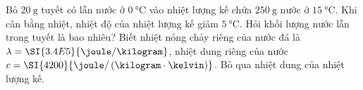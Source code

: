 \begin{ex}
Bỏ $\SI{20}{\gram}$ tuyết có lẫn nước ở $\SI{0}{\celsius}$ vào nhiệt lượng kế chứa $\SI{250}{\gram}$ nước ở $\SI{15}{\celsius}$. Khi cân bằng nhiệt, nhiệt độ của nhiệt lượng kế giảm $\SI{5}{\celsius}$. Hỏi khối lượng nước lẫn trong tuyết là bao nhiêu? Biết nhiệt nóng chảy riêng của nước đá là $\lambda=\SI{3.4E5}{\joule/\kilogram}$, nhiệt dung riêng của nước $c=\SI{4200}{\joule/\left(\kilogram\cdot\kelvin\right)}$. Bỏ qua nhiệt dung của nhiệt lượng kế.
\end{ex}

